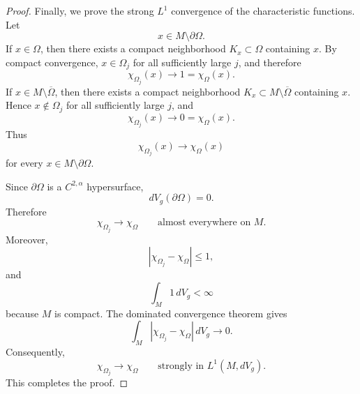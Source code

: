 \documentclass[10pt,a4paper]{amsart}
\begin{document}
\begin{proof}
Finally, we prove the strong $L^1$ convergence of the characteristic
functions. Let
\[
x\in M\setminus\partial\Omega.
\]
If $x\in\Omega$, then there exists a compact neighborhood
$K_x\subset\Omega$ containing $x$. By compact convergence,
$x\in\Omega_j$ for all sufficiently large $j$, and therefore
\[
\chi_{\Omega_j}(x)\longrightarrow1=\chi_\Omega(x).
\]
If
$x\in M\setminus\overline{\Omega}$, then there exists a compact
neighborhood
$K_x\subset M\setminus\overline{\Omega}$ containing $x$. Hence
$x\notin\Omega_j$ for all sufficiently large $j$, and
\[
\chi_{\Omega_j}(x)\longrightarrow0=\chi_\Omega(x).
\]
Thus
\[
\chi_{\Omega_j}(x)\longrightarrow\chi_\Omega(x)
\]
for every
$x\in M\setminus\partial\Omega$.

Since $\partial\Omega$ is a $C^{2,\alpha}$ hypersurface,
\[
dV_g(\partial\Omega)=0.
\]
Therefore
\[
\chi_{\Omega_j}\longrightarrow\chi_\Omega
\qquad\text{almost everywhere on }M.
\]
Moreover,
\[
|\chi_{\Omega_j}-\chi_\Omega|\le1,
\]
and
\[
\int_M1\,dV_g<\infty
\]
because $M$ is compact. The dominated convergence theorem gives
\[
\int_M
|\chi_{\Omega_j}-\chi_\Omega|\,dV_g
\longrightarrow0.
\]
Consequently,
\[
\chi_{\Omega_j}\longrightarrow\chi_\Omega
\qquad\text{strongly in }L^1(M,dV_g).
\]
This completes the proof.
\end{proof}
\end{document}
